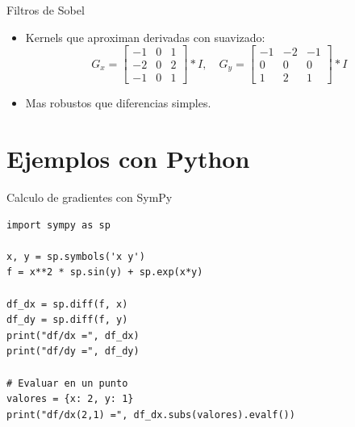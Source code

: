 \documentclass[aspectratio=169, 10pt, xcolor=table]{beamer}
\begin{document}
\begin{frame}{Filtros de Sobel}
    \begin{itemize}
        \item Kernels que aproximan derivadas con suavizado:
        \[
        G_x = \begin{bmatrix}
            -1 & 0 & 1 \\
            -2 & 0 & 2 \\
            -1 & 0 & 1
        \end{bmatrix} * I,\quad
        G_y = \begin{bmatrix}
            -1 & -2 & -1 \\
             0 &  0 &  0 \\
             1 &  2 &  1
        \end{bmatrix} * I
        \]
        \item Mas robustos que diferencias simples.
    \end{itemize}
\end{frame}

\section{Ejemplos con Python}

\begin{frame}[fragile]{Calculo de gradientes con SymPy}
    \begin{lstlisting}
import sympy as sp

x, y = sp.symbols('x y')
f = x**2 * sp.sin(y) + sp.exp(x*y)

df_dx = sp.diff(f, x)
df_dy = sp.diff(f, y)
print("df/dx =", df_dx)
print("df/dy =", df_dy)

# Evaluar en un punto
valores = {x: 2, y: 1}
print("df/dx(2,1) =", df_dx.subs(valores).evalf())
    \end{lstlisting}
\end{frame}
\end{document}
